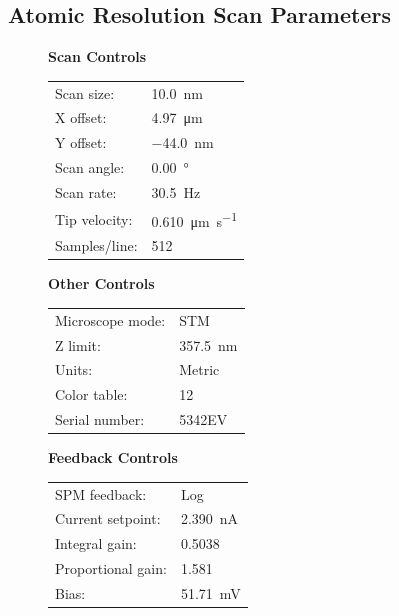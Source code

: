\documentclass[12pt,a4paper]{article}
\begin{document}
\subsection*{Atomic Resolution Scan Parameters}
\begin{figure}[H]
    \centering
    \begin{minipage}[t]{0.48\linewidth}
        \centering
        \textbf{Scan Controls}
        \begin{tabular}{|l|l|}
        \hline
        Scan size: & \SI{10.0}{\nano\meter} \\
        X offset: & \SI{4.97}{\micro\meter} \\
        Y offset: & \SI{-44.0}{\nano\meter} \\
        Scan angle: & \SI{0.00}{\degree} \\
        Scan rate: & \SI{30.5}{\hertz} \\
        Tip velocity: & \SI{0.610}{\micro\meter\per\second} \\
        Samples/line: & 512 \\
        \hline
        \end{tabular}
        
        \vspace{0.5cm}
        
        \textbf{Other Controls}
        \begin{tabular}{|l|l|}
        \hline
        Microscope mode: & STM \\
        Z limit: & \SI{357.5}{\nano\meter} \\
        Units: & Metric \\
        Color table: & 12 \\
        Serial number: & 5342EV \\
        \hline
        \end{tabular}
    \end{minipage}\hfill
    \begin{minipage}[t]{0.48\linewidth}
        \centering
        \textbf{Feedback Controls}
        \begin{tabular}{|l|l|}
        \hline
        SPM feedback: & Log \\
        Current setpoint: & \SI{2.390}{\nano\ampere} \\
        Integral gain: & 0.5038 \\
        Proportional gain: & 1.581 \\
        Bias: & \SI{51.71}{\milli\volt} \\
        \hline
        \end{tabular}
        

\end{minipage}
\end{figure}
\end{document}

